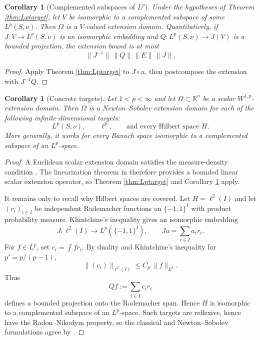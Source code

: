 \documentclass[11pt]{article}
\newtheorem{corollary}[theorem]{Corollary}
\theoremstyle{remark}
\newcommand{\R}{\mathbb{R}}
\newcommand{\Om}{\Omega}
\newcommand{\Wp}{W^{1,p}}
\begin{document}
\begin{corollary}[Complemented subspaces of $L^p$]
\label{cor:complemented}
Under the hypotheses of Theorem \ref{thm:Lptarget}, let $V$ be isomorphic to
a complemented subspace of some $L^p(S,\nu)$.  Then $\Om$ is a
$V$-valued extension domain.  Quantitatively, if
$J:V\to L^p(S,\nu)$ is an isomorphic embedding and
$Q:L^p(S,\nu)\to J(V)$ is a bounded projection, the extension bound is at
most
\[
  \|J^{-1}\|\,\|Q\|\,\|E\|\,\|J\|.
\]
\end{corollary}

\begin{proof}
Apply Theorem \ref{thm:Lptarget} to $J\circ u$, then postcompose the extension
with $J^{-1}Q$.
\end{proof}

\begin{corollary}[Concrete targets]
\label{cor:concrete}
Let $1<p<\infty$ and let $\Om\subset\R^n$ be a scalar $\Wp$-extension domain.
Then $\Om$ is a Newton--Sobolev extension domain for each of the following
infinite-dimensional targets:
\[
  L^p(S,\nu),\qquad \ell^p,\qquad\text{and every Hilbert space }H.
\]
More generally, it works for every Banach space isomorphic to a complemented
subspace of an $L^p$-space.
\end{corollary}

\begin{proof}
A Euclidean scalar extension domain satisfies the measure-density condition
\cite{HKT08b}.  The linearization theorem in \cite{GBIZ23} therefore provides
a bounded linear scalar extension operator, so Theorem
\ref{thm:Lptarget} and Corollary \ref{cor:complemented} apply.

It remains only to recall why Hilbert spaces are covered.  Let
$H=\ell^2(I)$ and let $(r_i)_{i\in I}$ be independent Rademacher functions on
$\{-1,1\}^I$ with product probability measure.  Khintchine's inequality
gives an isomorphic embedding
\[
  J:\ell^2(I)\longrightarrow L^p(\{-1,1\}^I),
  \qquad Ja=\sum_{i\in I}a_i r_i.
\]
For $f\in L^p$, set $c_i=\int f r_i$.  By duality and Khintchine's inequality
for $p'=p/(p-1)$,
\[
  \|(c_i)\|_{\ell^2(I)}\le C_{p'}\|f\|_{L^p}.
\]
Thus
\[
  Qf:=\sum_{i\in I}c_i r_i
\]
defines a bounded projection onto the Rademacher span.  Hence $H$ is
isomorphic to a complemented subspace of an $L^p$-space.  Such targets are
reflexive, hence have the Radon--Nikodym property, so the classical and
Newton--Sobolev formulations agree by \cite{CaamanoEtAl}.
\end{proof}
\end{document}
